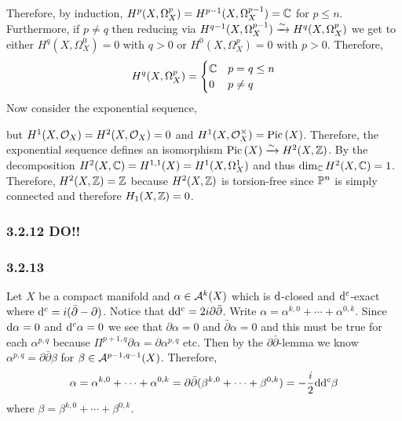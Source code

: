 \documentclass[12pt]{article}
\begin{document}
Therefore, by induction, $H^p(X, \Omega_X^p) = H^{p-1}(X, \Omega_X^{p-1}) = \C$ for $p \le n$. Furthermore, if $p \neq q$ then reducing via $H^{q-1}(X, \Omega^{p-1}_{X}) \iso H^q(X, \Omega^p_{X})$ we get to either $H^q(X, \Omega^0_X) = 0$ with $q > 0$ or $H^0(X, \Omega^p_X) = 0$ with $p > 0$. Therefore,
\[ H^q(X, \Omega^p_X) = 
\begin{cases}
\C & p = q \le n
\\
0 & p \neq q
\end{cases} \]
Now consider the exponential sequence,
\begin{center}
\end{center}
but $H^1(X, \struct{X}) = H^2(X, \struct{X}) = 0$ and $H^1(X, \struct{X}^\times) = \Pic{X}$. Therefore, the exponential sequence defines an isomorphism $\Pic{X} \iso H^2(X, \Z)$. By the \kahler decomposition $H^2(X, \C) = H^{1,1}(X) = H^1(X, \Omega^1_X)$ and thus $\dim_\C H^2(X, \C) = 1$. Therefore, $H^2(X, \Z) = \Z$ because $H^2(X, \Z)$ is torsion-free since $\P^n$ is simply connected and therefore $H_1(X, \Z) = 0$.

\subsubsection{3.2.12 DO!!}

\subsubsection{3.2.13}

Let $X$ be a compact \kahler manifold and $\alpha \in \A^k(X)$ which is $\d$-closed and $\dc$-exact where $\dc = i (\bar{\partial} - \partial)$. Notice that $\d \dc = 2 i \partial \bar{\partial}$. Write $\alpha = \alpha^{k, 0} + \cdots + \alpha^{0, k}$. Since $\d{\alpha} = 0$ and $\dc{\alpha} = 0$ we see that $\partial \alpha = 0$ and $\bar{\partial} \alpha = 0$ and this must be true for each $\alpha^{p,q}$ because $\Pi^{p+1,q} \partial \alpha = \partial \alpha^{p,q}$ etc. Then by the $\partial \bar{\partial}$-lemma we know $\alpha^{p,q} = \partial \bar{\partial} \beta$ for $\beta \in \A^{p-1,q-1}(X)$. Therefore, 
\[ \alpha = \alpha^{k, 0} + \cdots + \alpha^{0, k} = \partial \bar{\partial} (\beta^{k, 0} + \cdots + \beta^{0, k}) = - \frac{i}{2} \d \dc \beta \]
where $\beta = \beta^{k, 0} + \cdots + \beta^{0, k}$. 
\end{document}
